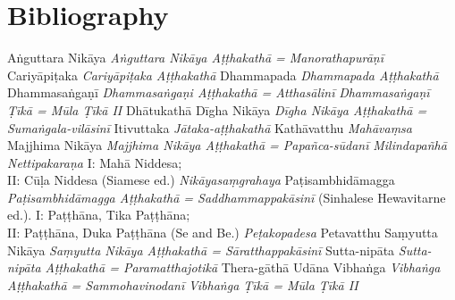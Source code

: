 \ifplastex
	\chapter{Bibliography}
\else
\fi
\begin{thebibliography}{xxxxxxxxxxx}
 Aṅguttara Nikāya
 \emph{Aṅguttara Nikāya Aṭṭhakathā = Manorathapurāṇī}
 Cariyāpiṭaka
 \emph{Cariyāpiṭaka Aṭṭhakathā}
 Dhammapada
 \emph{Dhammapada Aṭṭhakathā}
 Dhammasaṅgaṇī
 \emph{Dhammasaṅgaṇi Aṭṭhakathā = Atthasālinī}
 \emph{Dhammasaṅgaṇī Ṭīkā = Mūla Ṭīkā II}
 Dhātukathā
 Dīgha Nikāya
 \emph{Dīgha Nikāya Aṭṭhakathā = Sumaṅgala-vilāsinī}
 Itivuttaka
 \emph{Jātaka-aṭṭhakathā}
 Kathāvatthu
 \emph{Mahāvaṃsa}
 Majjhima Nikāya
 \emph{Majjhima Nikāya Aṭṭhakathā = Papañca-sūdanī}
 \emph{Milindapañhā}
 \emph{Nettipakaraṇa}
 I: Mahā Niddesa;\\ II: Cūḷa Niddesa (Siamese ed.)
 \emph{Nikāyasaṃgrahaya}
 Paṭisambhidāmagga
 \emph{Paṭisambhidāmagga Aṭṭhakathā = Saddhammappakāsinī} (Sinhalese Hewavitarne ed.).
 I: Paṭṭhāna, Tika Paṭṭhāna;\\ II: Paṭṭhāna, Duka Paṭṭhāna (Se and Be.)
 \emph{Peṭakopadesa}
 Petavatthu
 Saṃyutta Nikāya
 \emph{Saṃyutta Nikāya Aṭṭhakathā = Sāratthappakāsinī}
 Sutta-nipāta
 \emph{Sutta-nipāta Aṭṭhakathā = Paramatthajotikā}
 Thera-gāthā
 Udāna
 Vibhaṅga
 \emph{Vibhaṅga Aṭṭhakathā = Sammohavinodanī}
 \emph{Vibhaṅga Ṭīkā = Mūla Ṭīkā II}

\end{thebibliography}
